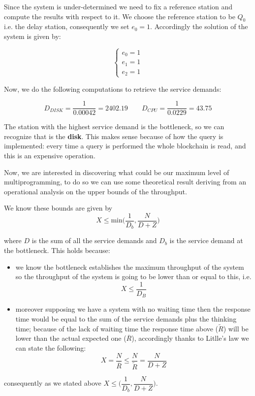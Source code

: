 \documentclass[11pt]{scrartcl} %
\begin{document}
Since the system is under-determined we need to fix a reference station and compute the  results with respect to it. We choose the reference station to  be $Q_0$ i.e. the  delay station, consequently we set $e_0 = 1$. Accordingly the solution of the system is given by:

$$\begin{cases} e_0=1\\ e_1=1\\ e_2=1\end{cases}$$

Now, we do the following  computations to retrieve the service demands:

$$D_{DISK}=\dfrac{1}{0.00042}=2402.19\qquad D_{CPU}=\dfrac{1}{0.0229}=43.75$$

The station with the highest service demand is the bottleneck, so we can recognize that is the \textbf{disk}. This makes sense because of how the query is implemented: every time a query is performed the whole blockchain is read, and this is an expensive operation.

Now, we are interested in discovering what could be our maximum level of multiprogramming, to do so we can use some theoretical result deriving from an operational analysis on the upper bounds of the throughput.


We know these bounds are given by $$X\leq \mathrm{min}\bigg(\dfrac{1}{D_b}, \dfrac{N}{D+Z}\bigg)$$

where $D$ is the sum of all the service demands and $D_b$ is the service demand at the bottleneck. This holds because:

\begin{itemize}
\item[\adforn{43}] we know the bottleneck establishes the maximum throughput of the system so the throughput of  the system is going to be lower than or equal to this, i.e. $$X\leq \dfrac{1}{D_B}$$ 
\item[\adforn{43}] moreover supposing we have a system with no waiting time then the response time would be equal to the sum of the service demands plus the thinking time; because of the lack of waiting time the response time above ($\widetilde{R}$) will be lower than the actual expected one ($\overline{R}$), accordingly thanks to Litlle's law we can state the following: $$X=\dfrac{N}{\overline{R}}\leq \dfrac{N}{\widetilde{R}}=\dfrac{N}{D+Z}$$
\end{itemize}

consequently as we stated above $X\leq\bigg(\dfrac{1}{D_b}, \dfrac{N}{D+Z}\bigg)$.\\
\end{document}
